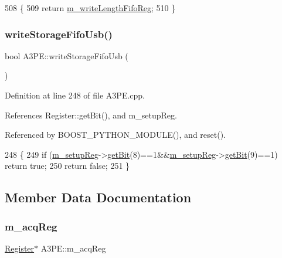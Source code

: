 \begin{DoxyCode}
508                                 \{
509     \textcolor{keywordflow}{return} \hyperlink{classA3PE_a9a0cb2253ea34c0be567a03684217fee}{m\_writeLengthFifoReg};
510   \}
\end{DoxyCode}
\mbox{\label{classA3PE_af15048318a126074e28df1c6120d5e0d}} 
\subsubsection{\texorpdfstring{write\+Storage\+Fifo\+Usb()}{writeStorageFifoUsb()}}
{\footnotesize\ttfamily bool A3\+P\+E\+::write\+Storage\+Fifo\+Usb (\begin{DoxyParamCaption}{ }\end{DoxyParamCaption})}



Definition at line 248 of file A3\+P\+E.\+cpp.



References Register\+::get\+Bit(), and m\+\_\+setup\+Reg.



Referenced by B\+O\+O\+S\+T\+\_\+\+P\+Y\+T\+H\+O\+N\+\_\+\+M\+O\+D\+U\+L\+E(), and reset().


\begin{DoxyCode}
248                               \{
249   \textcolor{keywordflow}{if} (\hyperlink{classA3PE_a142fa10b7e705c4701ae21678ec2ec8a}{m\_setupReg}->\hyperlink{classRegister_a5d27c9ff548817eee097ba4fdc8e8f69}{getBit}(8)==1&&\hyperlink{classA3PE_a142fa10b7e705c4701ae21678ec2ec8a}{m\_setupReg}->\hyperlink{classRegister_a5d27c9ff548817eee097ba4fdc8e8f69}{getBit}(9)==1) \textcolor{keywordflow}{return} \textcolor{keyword}{true};
250   \textcolor{keywordflow}{return} \textcolor{keyword}{false};
251 \}
\end{DoxyCode}


\subsection{Member Data Documentation}
\mbox{\label{classA3PE_abaf426f4c9192537117b77f9f4821e04}} 
\subsubsection{\texorpdfstring{m\+\_\+acq\+Reg}{m\_acqReg}}
{\footnotesize\ttfamily \hyperlink{classRegister}{Register}$\ast$ A3\+P\+E\+::m\+\_\+acq\+Reg\hspace{0.3cm}{\ttfamily [private]}}



